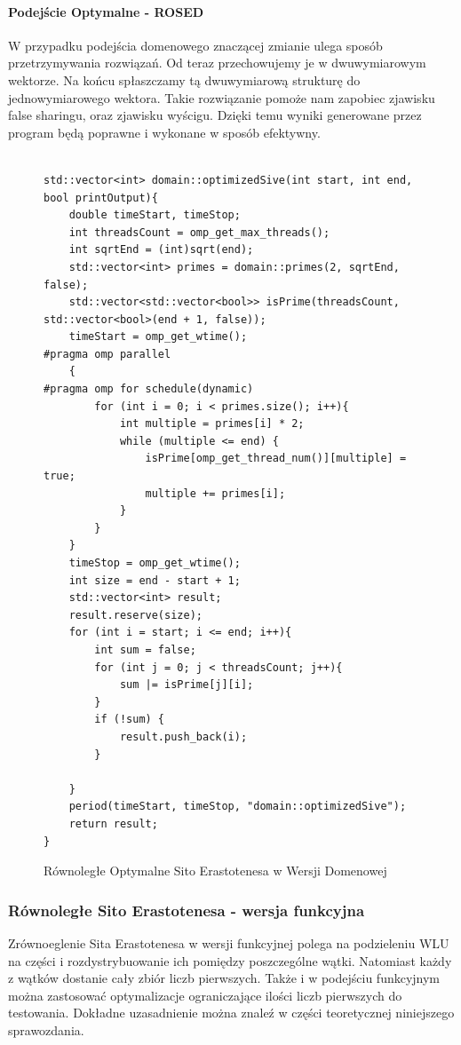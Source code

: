 \documentclass{article}
\begin{document}
                \paragraph{Podejście Optymalne - \gls{ROSED}}
                    W przypadku podejścia domenowego znaczącej zmianie ulega sposób przetrzymywania rozwiązań. Od teraz przechowujemy je w dwuwymiarowym wektorze. Na końcu spłaszczamy tą dwuwymiarową strukturę do jednowymiarowego wektora. Takie rozwiązanie pomoże nam zapobiec zjawisku false sharingu, oraz zjawisku wyścigu. Dzięki temu wyniki generowane przez program będą poprawne i wykonane w sposób efektywny.
                    \begin{figure}[H]
                        \begin{verbatim}

std::vector<int> domain::optimizedSive(int start, int end, bool printOutput){
    double timeStart, timeStop;
    int threadsCount = omp_get_max_threads();
    int sqrtEnd = (int)sqrt(end);
    std::vector<int> primes = domain::primes(2, sqrtEnd, false);
    std::vector<std::vector<bool>> isPrime(threadsCount, std::vector<bool>(end + 1, false));
    timeStart = omp_get_wtime();
#pragma omp parallel
    {
#pragma omp for schedule(dynamic)
        for (int i = 0; i < primes.size(); i++){
            int multiple = primes[i] * 2;
            while (multiple <= end) {
                isPrime[omp_get_thread_num()][multiple] = true;
                multiple += primes[i];
            }
        }
    }
    timeStop = omp_get_wtime();
    int size = end - start + 1;
    std::vector<int> result;
    result.reserve(size);
    for (int i = start; i <= end; i++){
        int sum = false;
        for (int j = 0; j < threadsCount; j++){
            sum |= isPrime[j][i];
        }
        if (!sum) {
            result.push_back(i);
        }

    }
    period(timeStart, timeStop, "domain::optimizedSive");
    return result;
}
                        \end{verbatim}
                        \caption{Równoległe Optymalne Sito Erastotenesa w Wersji Domenowej}
                    \end{figure}
                
                \subsubsection{Równoległe Sito Erastotenesa - wersja funkcyjna}
                    Zrównoeglenie Sita Erastotenesa w wersji funkcyjnej polega na podzieleniu \gls{WLU} na części i rozdystrybuowanie ich pomiędzy poszczególne wątki. Natomiast każdy z wątków dostanie cały zbiór liczb pierwszych. Także i w podejściu funkcyjnym można zastosować optymalizacje ograniczające ilości liczb pierwszych do testowania. Dokładne uzasadnienie można znaleź w części teoretycznej niniejszego sprawozdania.
\end{document}

